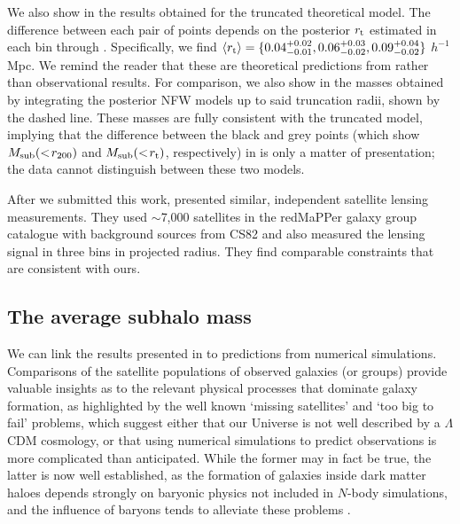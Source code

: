 We also show in  the results obtained for the truncated theoretical model. The 
difference between each pair of points depends on the posterior $r_{\rm t}$ estimated in each 
bin through . Specifically, we find $\langle r_{\rm 
t}\rangle=\{0.04_{-0.01}^{+0.02},0.06_{-0.02}^{+0.03},0.09_{-0.02}^{+0.04}\}$ $h^{-1}$Mpc. We 
remind the reader that these are theoretical predictions from  rather than 
observational results. For comparison, we also show in  the masses obtained by 
integrating the posterior NFW models up to said truncation radii, shown by the dashed line. 
These masses are fully consistent with the truncated model, implying that the difference 
between the black and grey points (which show $M_{\rm sub}(<\!r_{200})$ and $M_{\rm sub}(<\!r_{\rm 
t})$, respectively) in  is only a matter of presentation; the data cannot 
distinguish between these two models.

After we submitted this work, \cite{li16} presented similar, independent satellite lensing 
measurements. They used $\sim$7,000 satellites in the redMaPPer galaxy group catalogue 
\citep{rykoff14} with background sources from CS82 and also measured the lensing signal in three 
bins in projected radius. They find comparable constraints that are consistent with ours.

\subsection{The average subhalo mass}\label{s:shmf}

We can link the results presented in  to predictions from numerical simulations. 
Comparisons of the satellite populations of observed galaxies (or groups) provide valuable insights 
as to the relevant physical processes that dominate galaxy formation, as highlighted by the well 
known `missing satellites' \citep{klypin99,moore99} and `too big to fail' \citep{boylan11} problems, 
which suggest either that our Universe is not well described by a $\Lambda$CDM cosmology, or that 
using numerical simulations to predict observations is more complicated than anticipated. While the 
former may in fact be true, the latter is now well established, as the formation of galaxies inside 
dark matter haloes depends strongly on baryonic physics not included in $N$-body simulations, and 
the influence of baryons tends to alleviate these problems \citep{zolotov12}.

